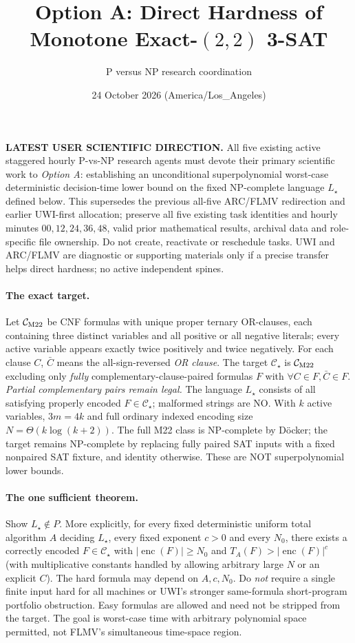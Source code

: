 \documentclass[11pt]{article}
\title{Option A: Direct Hardness of Monotone Exact-$(2,2)$ 3-SAT}
\author{P versus NP research coordination}
\date{24 October 2026 (America/Los_Angeles)}
\begin{document}
\maketitle
\noindent\textbf{LATEST USER SCIENTIFIC DIRECTION.}
All five existing active staggered hourly P-vs-NP research agents must devote their primary scientific work to \emph{Option A}: establishing an unconditional superpolynomial worst-case deterministic decision-time lower bound on the fixed NP-complete language $L_\star$ defined below. This supersedes the previous all-five ARC/FLMV redirection and earlier UWI-first allocation; preserve all five existing task identities and hourly minutes $00,12,24,36,48$, valid prior mathematical results, archival data and role-specific file ownership. Do not create, reactivate or reschedule tasks. UWI and ARC/FLMV are diagnostic or supporting materials only if a precise transfer helps direct hardness; no active independent spines.

\paragraph{The exact target.}
Let $\mathcal C_{\rm M22}$ be CNF formulas with unique proper ternary OR-clauses, each containing three distinct variables and all positive or all negative literals; every active variable appears exactly twice positively and twice negatively. For each clause $C$, $\bar C$ means the all-sign-reversed \emph{OR clause}. The target $\mathcal C_\star$ is $\mathcal C_{\rm M22}$ excluding only \emph{fully} complementary-clause-paired formulas $F$ with $\forall C\in F,\bar C\in F$. \emph{Partial complementary pairs remain legal.} The language $L_\star$ consists of all satisfying properly encoded $F\in\mathcal C_\star$; malformed strings are NO. With $k$ active variables, $3m=4k$ and full ordinary indexed encoding size $N=\Theta(k\log(k+2))$. The full M22 class is NP-complete by D\"ocker; the target remains NP-complete by replacing fully paired SAT inputs with a fixed nonpaired SAT fixture, and identity otherwise. These are NOT superpolynomial lower bounds.

\paragraph{The one sufficient theorem.}
Show $L_\star\notin P$. More explicitly, for every fixed deterministic uniform total algorithm $A$ deciding $L_\star$, every fixed exponent $c>0$ and every $N_0$, there exists a correctly encoded $F\in\mathcal C_\star$ with $|\operatorname{enc}(F)|\ge N_0$ and $T_A(F)>|\operatorname{enc}(F)|^c$ (with multiplicative constants handled by allowing arbitrary large $N$ or an explicit $C$). The hard formula may depend on $A,c,N_0$. Do \emph{not} require a single finite input hard for all machines or UWI's stronger same-formula short-program portfolio obstruction. Easy formulas are allowed and need not be stripped from the target. The goal is worst-case time with arbitrary polynomial space permitted, not FLMV's simultaneous time-space region.
\end{document}
